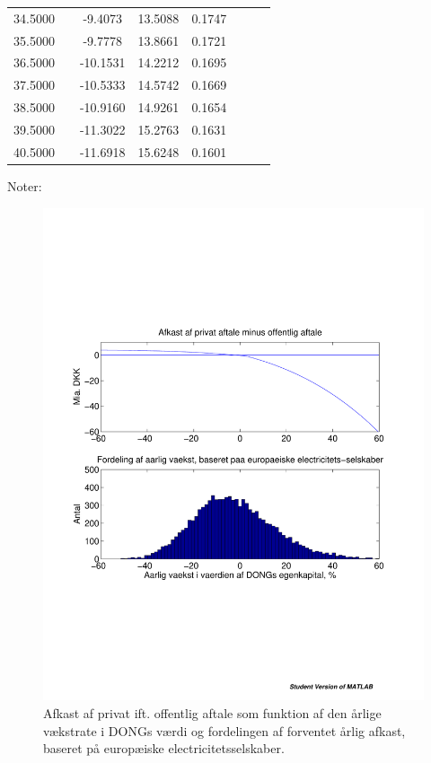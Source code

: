 \documentclass{article}
\begin{document}
\begin{table}[h]
\begin{tabularx}{\linewidth}{cXcccccr}
34.5000&&-9.4073&13.5088& 0.1747\\
35.5000&&-9.7778&13.8661& 0.1721\\
36.5000&&-10.1531&14.2212& 0.1695\\
37.5000&&-10.5333&14.5742& 0.1669\\
38.5000&&-10.9160&14.9261& 0.1654\\
39.5000&&-11.3022&15.2763& 0.1631\\
40.5000&&-11.6918&15.6248& 0.1601\\
		\bottomrule[1pt]
	\end{tabularx}
	\begin{minipage}{\linewidth}
		\footnotesize{Noter: }
	\end{minipage}
\end{table}


\begin{figure}
\includegraphics[scale=0.8]{../matlab/figs/afkast_hist_combine_elec}
\caption{Afkast af privat ift. offentlig aftale som funktion af den årlige v\ae{}kstrate i DONGs v\ae{}rdi og fordelingen af forventet \aa{}rlig afkast, baseret p\aa{} europ\ae{}iske electricitetsselskaber.}
\label{fig:combine1}
\end{figure}
\end{document}
